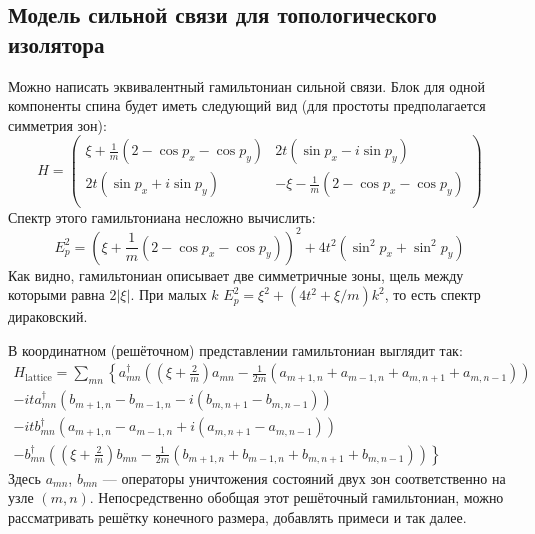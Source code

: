 \subsection{Модель сильной связи для топологического изолятора}
Можно написать эквивалентный гамильтониан сильной связи. Блок
для одной компоненты спина будет иметь следующий вид (для простоты предполагается симметрия
зон):
\begin{equation}
    \label{BHZ}
    H = \left(\begin{matrix}
            \xi + \frac{1}{m}(2 - \cos{p_x} - \cos{p_y}) & 2t(\sin{p_x} - i\sin{p_y})   \\
            2t(\sin{p_x} + i\sin{p_y}) & - \xi - \frac{1}{m}(2 - \cos{p_x} - \cos{p_y}) \\
        \end{matrix}\right)
\end{equation}
Спектр этого гамильтониана несложно вычислить:
\begin{equation}
    E_p^2 = (\xi + \frac{1}{m}(2 - \cos{p_x} - \cos{p_y}))^2 + 4t^2(\sin^2{p_x} + \sin^2{p_y})
\end{equation}
Как видно, гамильтониан описывает две симметричные зоны, щель между которыми равна $2|\xi|$. 
При малых $k$ $E_p^2 = \xi^2 + (4t^2 + \xi/m)k^2$, то есть спектр дираковский.

В координатном (решёточном) представлении гамильтониан выглядит так:
\begin{multline}
    \label{BHZ_tight_binding}
    H_{\mathrm{lattice}} = \sum_{mn} \left\{
        a_{mn}^\dagger\left( \left(\xi + \frac{2}{m}\right) a_{mn}
                 -\frac{1}{2m}(a_{m+1,n} + a_{m-1,n} + a_{m,n+1} + a_{m,n-1})\right)\right. \\
        -it a_{mn}^\dagger(b_{m+1,n} -b_{m-1,n} - i(b_{m,n+1} - b_{m,n-1}))\\
        -it b_{mn}^\dagger(a_{m+1,n} -a_{m-1,n} + i(a_{m,n+1} - a_{m,n-1}))\\
        -\left. b_{mn}^\dagger\left( \left(\xi + \frac{2}{m}\right) b_{mn}
                 -\frac{1}{2m}(b_{m+1,n} + b_{m-1,n} + b_{m,n+1} + b_{m,n-1})\right) \right\}
\end{multline}
Здесь $a_{mn}$, $b_{mn}$ --- операторы уничтожения состояний двух зон 
соответственно на узле $(m,n)$. Непосредственно обобщая этот решёточный гамильтониан, можно
рассматривать решётку конечного размера, добавлять примеси и так далее. 
